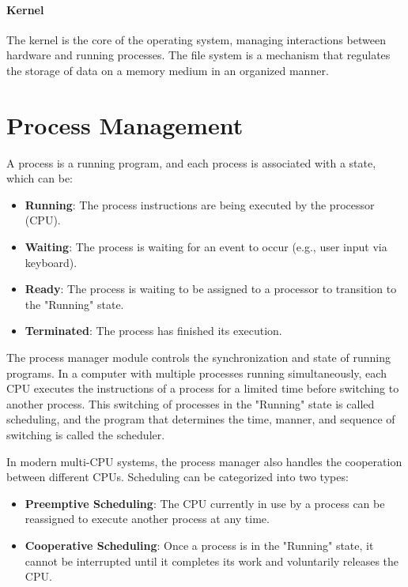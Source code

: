 \paragraph{Kernel}
The kernel is the core of the operating system, managing interactions between hardware and running processes. The file system is a mechanism that regulates the storage of data on a memory medium in an organized manner.

\section{Process Management}
A process is a running program, and each process is associated with a state, which can be:

\begin{itemize}
    \item \textbf{Running}: The process instructions are being executed by the processor (CPU).
    \item \textbf{Waiting}: The process is waiting for an event to occur (e.g., user input via keyboard).
    \item \textbf{Ready}: The process is waiting to be assigned to a processor to transition to the "Running" state.
    \item \textbf{Terminated}: The process has finished its execution.
\end{itemize}

The process manager module controls the synchronization and state of running programs. In a computer with multiple processes running simultaneously, each CPU executes the instructions of a process for a limited time before switching to another process. This switching of processes in the "Running" state is called scheduling, and the program that determines the time, manner, and sequence of switching is called the scheduler.

In modern multi-CPU systems, the process manager also handles the cooperation between different CPUs. Scheduling can be categorized into two types:

\begin{itemize}
    \item \textbf{Preemptive Scheduling}: The CPU currently in use by a process can be reassigned to execute another process at any time.
    \item \textbf{Cooperative Scheduling}: Once a process is in the "Running" state, it cannot be interrupted until it completes its work and voluntarily releases the CPU.
\end{itemize}

